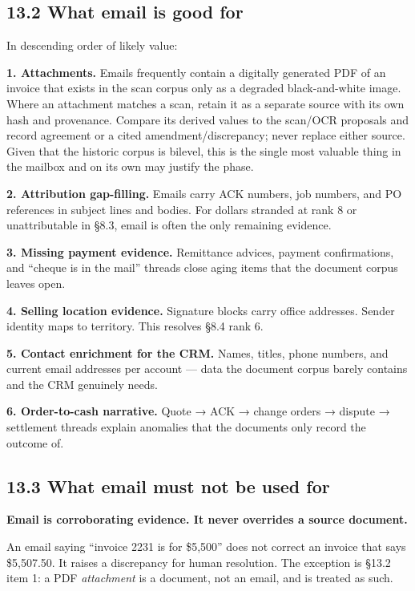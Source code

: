 \documentclass[
]{article}
\begin{document}
\subsection{13.2 What email is good for}\label{what-email-is-good-for}

In descending order of likely value:

\textbf{1. Attachments.} Emails frequently contain a digitally generated
PDF of an invoice that exists in the scan corpus only as a degraded
black-and-white image. Where an attachment matches a scan, retain it as
a separate source with its own hash and provenance. Compare its derived
values to the scan/OCR proposals and record agreement or a cited
amendment/discrepancy; never replace either source. Given that the
historic corpus is bilevel, this is the single most valuable thing in
the mailbox and on its own may justify the phase.

\textbf{2. Attribution gap-filling.} Emails carry ACK numbers, job
numbers, and PO references in subject lines and bodies. For dollars
stranded at rank 8 or unattributable in §8.3, email is often the only
remaining evidence.

\textbf{3. Missing payment evidence.} Remittance advices, payment
confirmations, and ``cheque is in the mail'' threads close aging items
that the document corpus leaves open.

\textbf{4. Selling location evidence.} Signature blocks carry office
addresses. Sender identity maps to territory. This resolves §8.4 rank 6.

\textbf{5. Contact enrichment for the CRM.} Names, titles, phone
numbers, and current email addresses per account --- data the document
corpus barely contains and the CRM genuinely needs.

\textbf{6. Order-to-cash narrative.} Quote → ACK → change orders →
dispute → settlement threads explain anomalies that the documents only
record the outcome of.

\subsection{13.3 What email must not be used
for}\label{what-email-must-not-be-used-for}

\textbf{Email is corroborating evidence. It never overrides a source
document.}

An email saying ``invoice 2231 is for \$5,500'' does not correct an
invoice that says \$5,507.50. It raises a discrepancy for human
resolution. The exception is §13.2 item 1: a PDF \emph{attachment} is a
document, not an email, and is treated as such.
\end{document}
